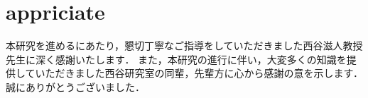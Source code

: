 \chapter* {appriciate}
本研究を進めるにあたり，懇切丁寧なご指導をしていただきました西谷滋人教授先生に深く感謝いたします． また，本研究の進行に伴い，大変多くの知識を提供していただきました西谷研究室の同輩，先輩方に心から感謝の意を示します． 誠にありがとうございました．